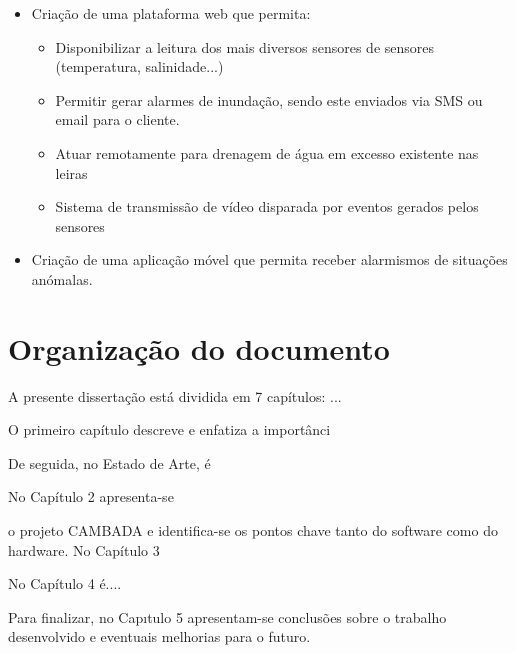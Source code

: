 \begin{itemize}
    \item Criação de uma plataforma web que permita: 

    \begin{itemize}
        \item Disponibilizar a leitura dos mais diversos sensores de sensores (temperatura, salinidade...)
        
        \item Permitir gerar alarmes de inundação, sendo este enviados via SMS ou email para o cliente. 
        
        \item Atuar remotamente para drenagem de água em excesso existente nas leiras
        
        \item Sistema de transmissão de vídeo disparada por eventos gerados pelos sensores
        
        
    \end{itemize}
    
    \item Criação de uma aplicação móvel que permita receber alarmismos de situações anómalas. 
\end{itemize}


\section{Organização do documento}


A presente dissertação está dividida em 7 capítulos: ...

O primeiro capítulo descreve e enfatiza a importânci

De seguida, no Estado de Arte, é




No Capítulo 2 apresenta-se 



o projeto CAMBADA e identifica-se os pontos chave tanto
do software como do hardware. No Capítulo 3 


No Capítulo 4 é.... 

Para finalizar, no Capıtulo 5 apresentam-se conclusões sobre o trabalho desenvolvido e eventuais melhorias para o futuro.










